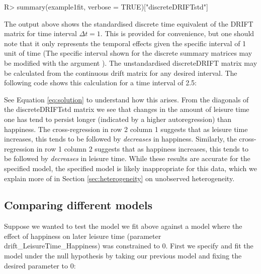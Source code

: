\documentclass[nojss]{jss}\usepackage[]{graphicx}\usepackage[]{color}
\begin{document}
\begin{Schunk}
\begin{Sinput}
R> summary(example1fit, verbose = TRUE)["discreteDRIFTstd"]
\end{Sinput}
\end{Schunk}

The output above shows the standardised discrete time equivalent of the DRIFT matrix for time interval $\Delta t = 1$. This is provided for convenience, but one should note that it only represents the temporal effects given the specific interval of 1 unit of time (The specific interval shown for the discrete summary matrices may be modified with the argument ).  The unstandardised discreteDRIFT matrix may be calculated from the continuous drift matrix for any desired interval. The following code shows this calculation for a time interval of 2.5: 

\begin{Schunk}
\end{Schunk}

See Equation \ref{eq:solution} to understand how this arises. From the diagonals of the discreteDRIFTstd matrix we see that changes in the amount of leisure time one has tend to persist longer (indicated by a higher autoregression) than happiness. The cross-regression in row 2 column 1 suggests that as leisure time increases, this tends to be followed by \textit{decreases} in happiness. Similarly, the cross-regression in row 1 column 2 suggests that as happiness increases, this tends to be followed by \textit{decreases} in leisure time. While these results are accurate for the specified model, the specified model is likely inappropriate for this data, which we explain more of in Section \ref{sec:heterogeneity} on unobserved heterogeneity.

\subsection{Comparing different models} \label{sec:testing}\nopagebreak
Suppose we wanted to test the model we fit above against a model where the effect of happiness on later leisure time (parameter drift\_LeisureTime\_Happiness) was constrained to 0. First we specify and fit the model under the null hypothesis by taking our previous model and fixing the desired parameter to 0:
\end{document}
